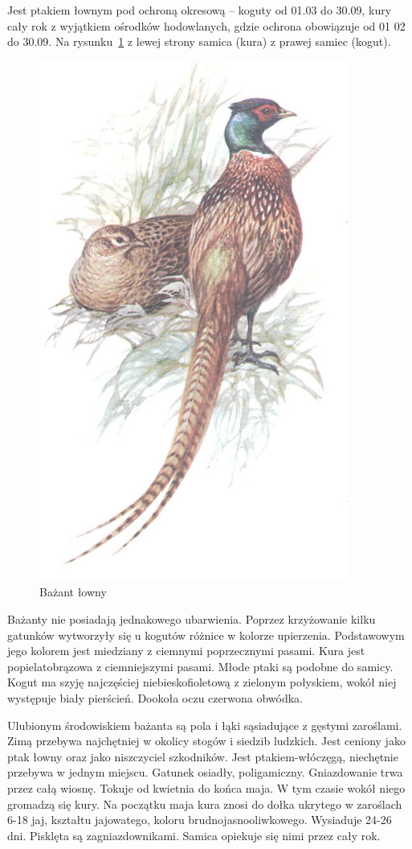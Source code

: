 \documentclass[a4paper,12pt,twoside]{article}
\begin{document}
Jest ptakiem łownym pod ochroną okresową -- koguty od 01.03 do 30.09, kury cały rok z wyjątkiem ośrodków hodowlanych, gdzie ochrona obowiązuje od 01 02 do 30.09.
Na rysunku~\ref{fig:bazant} z lewej strony samica (kura) z prawej samiec (kogut). 

\begin{figure}
\centerline{\includegraphics[scale=0.5]{bazant-lowny}}
\caption{Bażant łowny}
\label{fig:bazant}
\end{figure}

Bażanty nie posiadają jednakowego ubarwienia. Poprzez krzyżowanie kilku gatunków wytworzyły się u kogutów różnice w kolorze upierzenia. Podstawowym jego kolorem jest miedziany z ciemnymi poprzecznymi pasami. Kura jest popielatobrązowa z ciemniejszymi pasami. Młode ptaki są podobne do samicy. Kogut ma szyję najczęściej niebieskofioletową z zielonym połyskiem, wokół niej występuje biały pierścień. Dookoła oczu czerwona obwódka.

Ulubionym środowiskiem bażanta są pola i łąki sąsiadujące z gęstymi zaroślami. Zimą przebywa najchętniej w okolicy stogów i siedzib ludzkich. Jest ceniony jako ptak łowny oraz jako niszczyciel szkodników. Jest ptakiem-włóczęgą, niechętnie przebywa w jednym miejscu. Gatunek osiadły, poligamiczny. Gniazdowanie trwa przez całą wiosnę. Tokuje od kwietnia do końca maja. W tym czasie wokół niego gromadzą się kury. Na początku maja kura znosi do dołka ukrytego w zaroślach 6-18 jaj, kształtu jajowatego, koloru brudnojasnooliwkowego. Wysiaduje 24-26 dni. Pisklęta są zagniazdownikami. Samica opiekuje się nimi przez cały rok. 
\end{document}
